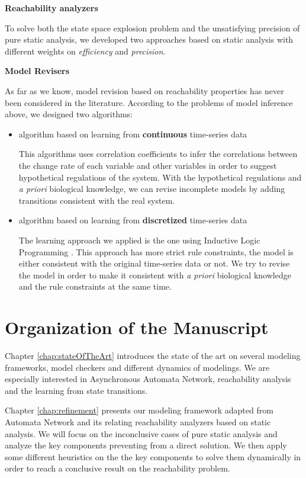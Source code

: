 \textbf{Reachability analyzers}

To solve both the state space explosion problem and the unsatisfying precision of pure static analysis, we developed two approaches based on static analysis with different weights on \textit{efficiency} and \textit{precision}.

\textbf{Model Revisers}

As far as we know, model revision based on reachability properties has never been considered in the literature.
According to the problems of model inference above, we designed two algorithms:
\begin{itemize}
    \item algorithm based on learning from \textbf{continuous} time-series data
    
    This algorithms uses correlation coefficients to infer the correlations between the change rate of each variable and other variables in order to suggest hypothetical regulations of the system.
    With the hypothetical regulations and \textit{a priori} biological knowledge, we can revise incomplete models by adding transitions consistent with the real system.
    \item algorithm based on learning from \textbf{discretized} time-series data
    
    The learning approach we applied is the one using Inductive Logic Programming \cite{ribeiro2018learning}.
    This approach has more strict rule constraints, the model is either consistent with the original time-series data or not.
    We try to revise the model in order to make it consistent with \textit{a priori} biological knowledge and the rule constraints at the same time.
\end{itemize}


\section{Organization of the Manuscript}
Chapter \ref{chap:stateOfTheArt} introduces the state of the art on several modeling frameworks, model checkers and different dynamics of modelings.
We are especially interested in Asynchronous Automata Network, reachability analysis and the learning from state transitions.

Chapter \ref{chap:refinement} presents our modeling framework adapted from Automata Network and its relating reachability analyzers based on static analysis.
We will focus on the inconclusive cases of pure static analysis and analyze the key components preventing from a direct solution.
We then apply some different heuristics on the the key components to solve them dynamically in order to reach a conclusive result on the reachability problem.

